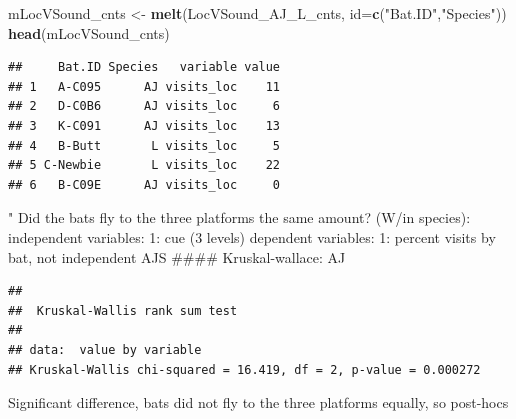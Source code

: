 \documentclass[]{article}
\newenvironment{Shaded}{\begin{snugshade}}{\end{snugshade}}
\newcommand{\KeywordTok}[1]{\textcolor[rgb]{0.13,0.29,0.53}{\textbf{{#1}}}}
\newcommand{\DataTypeTok}[1]{\textcolor[rgb]{0.13,0.29,0.53}{{#1}}}
\newcommand{\StringTok}[1]{\textcolor[rgb]{0.31,0.60,0.02}{{#1}}}
\newcommand{\NormalTok}[1]{{#1}}
\begin{document}
\begin{Shaded}
\begin{Highlighting}[]
\NormalTok{mLocVSound_cnts <-}\StringTok{ }\KeywordTok{melt}\NormalTok{(LocVSound_AJ_L_cnts, }\DataTypeTok{id=}\KeywordTok{c}\NormalTok{(}\StringTok{"Bat.ID"}\NormalTok{,}\StringTok{"Species"}\NormalTok{))}
\KeywordTok{head}\NormalTok{(mLocVSound_cnts)}
\end{Highlighting}
\end{Shaded}

\begin{verbatim}
##     Bat.ID Species   variable value
## 1   A-C095      AJ visits_loc    11
## 2   D-C0B6      AJ visits_loc     6
## 3   K-C091      AJ visits_loc    13
## 4   B-Butt       L visits_loc     5
## 5 C-Newbie       L visits_loc    22
## 6   B-C09E      AJ visits_loc     0
\end{verbatim}

\begin{Shaded}
\end{Shaded}

" Did the bats fly to the three platforms the same amount? (W/in
species): independent variables: 1: cue (3 levels) dependent variables:
1: percent visits by bat, not independent AJS \#\#\#\# Kruskal-wallace:
AJ

\begin{Shaded}
\end{Shaded}

\begin{verbatim}
## 
##  Kruskal-Wallis rank sum test
## 
## data:  value by variable
## Kruskal-Wallis chi-squared = 16.419, df = 2, p-value = 0.000272
\end{verbatim}

Significant difference, bats did not fly to the three platforms equally,
so post-hocs
\end{document}

